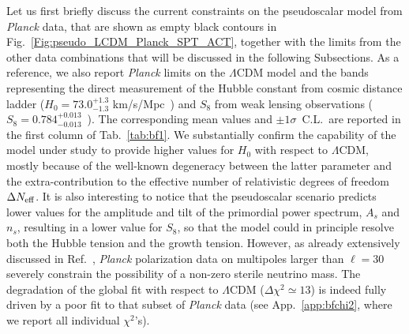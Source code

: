 \documentclass[a4paper,11pt]{article}
\begin{document}
Let us first briefly discuss the current constraints on the pseudoscalar model from {\it Planck} data, that are shown as empty black contours in Fig.~\ref{Fig:pseudo_LCDM_Planck_SPT_ACT}, together with the limits from the other data combinations that will be discussed in the following Subsections. As a reference, we also report \textit{Planck} limits on the $\Lambda$CDM model and the bands representing the direct measurement of the Hubble constant from cosmic distance ladder ($H_0=73.0^{+1.3}_{-1.3}$ km/s/Mpc~\cite{Riess:2020fzl}) and $S_8$ from weak lensing observations ($S_8=0.784^{+0.013}_{-0.013}$~\cite{Gatti:2021uwl}).
The corresponding mean values and $\pm 1 \sigma$~C.L.\ are reported in the first column of Tab.~\ref{tab:bf1}.
We substantially confirm the capability of the model under study to provide higher values for $H_0$ with respect to $\Lambda$CDM, mostly {because of} the well-known degeneracy between the latter parameter and the extra-contribution to the effective number of relativistic degrees of freedom $\Delta N_{\rm eff}$.
It is also interesting to notice that the pseudoscalar scenario predicts lower values for the amplitude and tilt of the primordial power spectrum, $A_s$ and $n_s$, resulting in a lower value for $S_8$, so that the model could in principle resolve both the Hubble tension and the growth tension.
However, as already extensively discussed in Ref.~\cite{Archidiacono:2020yey}, \textit{Planck} polarization data on multipoles larger than $\ell = 30$ severely constrain the possibility of a non-zero sterile neutrino mass.
The degradation of the global fit with respect to $\Lambda$CDM ($\Delta \chi^2 \simeq 13$) is indeed fully driven by a poor fit to that subset of \textit{Planck} data (see App.~\ref{app:bfchi2}, where we report all individual $\chi^2$'s).

\end{document}
